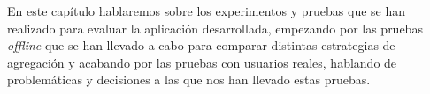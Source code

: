 En este capítulo hablaremos sobre los experimentos y pruebas que se han realizado para evaluar la aplicación desarrollada, empezando por 
las pruebas \textit{offline} que se han llevado a cabo para comparar distintas estrategias de agregación y acabando por las pruebas con usuarios reales, 
hablando de problemáticas y decisiones a las que nos han llevado estas pruebas.